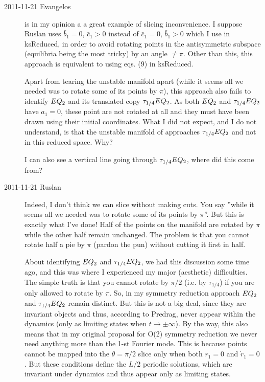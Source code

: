 \begin{description}
\item[2011-11-21 Evangelos]  is in my opinion a
a great example of slicing inconvenience. I suppose Ruslan uses
$\bar{b}_1 = 0$, $\bar{c}_1 > 0$ instead of $\bar{c}_1 = 0$, $\bar{b}_1 > 0$
which I use in ksReduced, in order to avoid rotating points in the antisymmetric
subspace (equilibria being the most tricky) by an angle $\neq \pi$.
Other than this, this approach is equivalent to using eqs. (9) in ksReduced.

Apart from tearing the unstable manifold apart (while it seems all we needed
was to rotate some of its points by $\pi$), this approach also fails to identify
$EQ_{2}$ and its translated copy $\tau_{1/4}EQ_{2}$. As both $EQ_{2}$ and
$\tau_{1/4}EQ_{2}$ have $a_1=0$, these point are not rotated at all and they must
have been drawn using their initial coordinates. What I did not expect,
and I do not understand, is that the unstable manifold of 
approaches $\tau_{1/4}EQ_{2}$ and not  in this reduced space. Why?

I can also see a vertical line going through $\tau_{1/4}EQ_{2}$, where did this
come from?


\item[2011-11-21 Ruslan] Indeed, I don't think we can slice without making cuts.  You say ''while it seems all we needed was to rotate some of its points by $\pi$''.  But this is exactly what I've done!  Half of the points on the manifold are rotated by $\pi$ while the other half remain unchanged.  The problem is that you cannot rotate half a pie by $\pi$ (pardon the pun) without cutting it first in half.

    About identifying $EQ_{2}$ and $\tau_{1/4}EQ_{2}$, we had this discussion some time ago, and this was where I experienced my major (aesthetic) difficulties.  The simple truth is that you cannot rotate by $\pi/2$ (i.e. by $\tau_{1/4}$) if you are only allowed to rotate by $\pi$.  So, in my symmetry reduction approach $EQ_{2}$ and $\tau_{1/4}EQ_{2}$ remain distinct.  But this is not a big deal, since they are invariant objects and thus, according to Predrag, never appear within the dynamics (only as limiting states when $t \to \pm \infty$).
    By the way, this also means that in my original proposal for O(2) symmetry reduction we never need anything more than the 1-st Fourier mode.  This is because points cannot be mapped into the $\theta = \pi/2$ slice only when both $r_1 = 0$ and $\dot{r}_1 = 0$.  But these conditions define the $L/2$ periodic solutions, which are invariant under \KS dynamics and thus appear only as limiting states.


\end{description}
